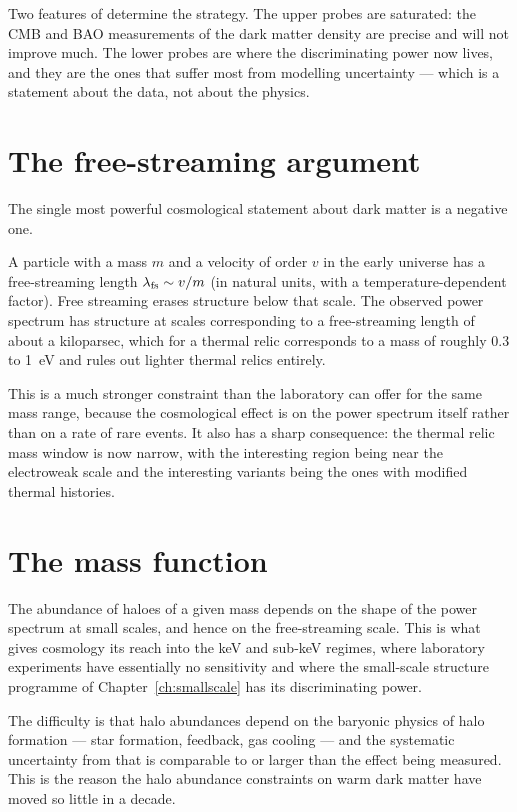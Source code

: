 Two features of  determine the strategy. The upper
probes are saturated: the CMB and BAO measurements of the dark matter
density are precise and will not improve much. The lower probes are where
the discriminating power now lives, and they are the ones that suffer most
from modelling uncertainty --- which is a statement about the data, not
about the physics.

\section{The free-streaming argument}The single most powerful cosmological
statement about dark matter is a negative one.

A particle with a mass $m$ and a velocity of order $v$ in the early universe
has a free-streaming length $\lambda_{\rm fs} \sim v/m$ (in natural units,
with a temperature-dependent factor). Free streaming erases structure below
that scale. The observed power spectrum has structure at scales corresponding
to a free-streaming length of about a kiloparsec, which for a thermal relic
corresponds to a mass of roughly 0.3 to 1~eV and rules out lighter thermal
relics entirely.

This is a much stronger constraint than the laboratory can offer for the same
mass range, because the cosmological effect is on the power spectrum itself
rather than on a rate of rare events. It also has a sharp consequence: the
thermal relic mass window is now narrow, with the interesting region being
near the electroweak scale and the interesting variants being the ones with
modified thermal histories.

\section{The mass function}The abundance of haloes of a given mass depends on the
shape of the power spectrum at small scales, and hence on the free-streaming
scale. This is what gives cosmology its reach into the keV and
sub-keV regimes, where laboratory experiments have essentially no
sensitivity and where the small-scale structure programme of
Chapter~\ref{ch:smallscale} has its discriminating power.

The difficulty is that halo abundances depend on the baryonic physics of
halo formation --- star formation, feedback, gas cooling --- and the
systematic uncertainty from that is comparable to or larger than the effect
being measured. This is the reason the halo abundance constraints on
warm dark matter have moved so little in a decade.

